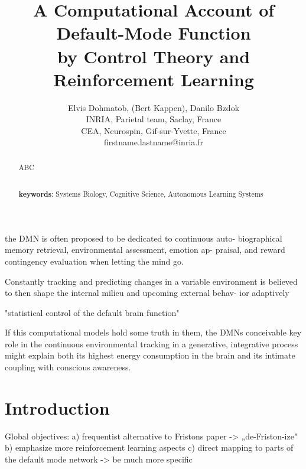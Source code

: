 \documentclass{article} %
\title{A Computational Account of Default-Mode Function\\by Control Theory and Reinforcement Learning}
\begin{document}
\author{Elvis Dohmatob, (Bert Kappen), Danilo Bzdok\\
  INRIA, Parietal team, Saclay, France\\
  CEA, Neurospin, Gif-sur-Yvette, France\\
  firstname.lastname@inria.fr}

\maketitle

\begin{abstract}
ABC
%


\textbf{\\keywords}: Systems Biology, Cognitive Science, Autonomous Learning Systems

\end{abstract}

the DMN is often proposed to be dedicated to continuous auto- biographical memory retrieval, environmental assessment, emotion ap- praisal, and reward contingency evaluation when letting the mind go.

Constantly tracking and predicting changes in a variable environment is believed to then shape the internal milieu and upcoming external behav- ior adaptively 


"statistical control of the default brain function"


If this computational models hold some truth in them, the DMNs conceivable key role in the continuous environmental tracking in a generative, integrative process might explain both its highest energy consumption in the brain and its intimate coupling with conscious awareness.




\section{Introduction}
%

Global objectives:
a) frequentist alternative to Fristons paper -> „de-Friston-ize"
b) emphasize more reinforcement learning aspects
c) direct mapping to parts of the default mode network -> be much more specific
\end{document}
